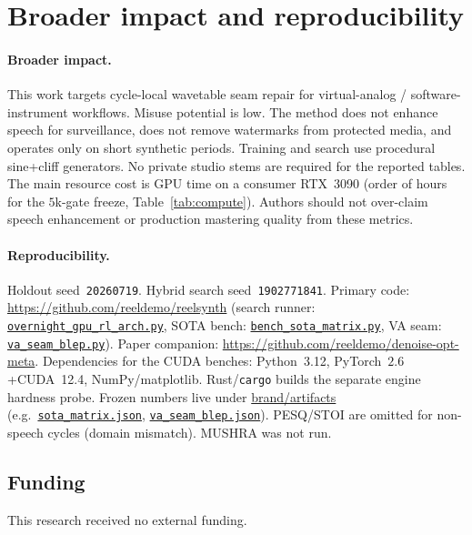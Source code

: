 \section{Broader impact and reproducibility}
\label{sec:ethics}

\paragraph{Broader impact.}
This work targets cycle-local wavetable seam repair for virtual-analog / software-instrument workflows.
Misuse potential is low.
The method does not enhance speech for surveillance, does not remove watermarks from protected media, and operates only on short synthetic periods.
Training and search use procedural sine{+}cliff generators. No private studio stems are required for the reported tables.
The main resource cost is GPU time on a consumer RTX~3090 (order of hours for the $5$k-gate freeze, Table~\ref{tab:compute}).
Authors should not over-claim speech enhancement or production mastering quality from these metrics.

\paragraph{Reproducibility.}
Holdout seed~\texttt{20260719}. Hybrid search seed~\texttt{1902771841}.
Primary code: \url{https://github.com/reeldemo/reelsynth}
(search runner:
\href{https://github.com/reeldemo/reelsynth/blob/main/scripts/overnight_gpu_rl_arch.py}{\texttt{overnight\_gpu\_rl\_arch.py}},
SOTA bench:
\href{https://github.com/reeldemo/reelsynth/blob/main/scripts/bench_sota_matrix.py}{\texttt{bench\_sota\_matrix.py}},
VA seam:
\href{https://github.com/reeldemo/reelsynth/blob/main/scripts/baselines/va_seam_blep.py}{\texttt{va\_seam\_blep.py}}).
Paper companion: \url{https://github.com/reeldemo/denoise-opt-meta}.
Dependencies for the CUDA benches: Python~3.12, PyTorch~$2.6$+CUDA~12.4, NumPy/matplotlib. Rust/\texttt{cargo} builds the separate engine hardness probe.
Frozen numbers live under
\href{https://github.com/reeldemo/reelsynth/tree/main/brand/artifacts}{brand/artifacts}
(e.g.\
\href{https://github.com/reeldemo/reelsynth/blob/main/brand/artifacts/sota_matrix.json}{\texttt{sota\_matrix.json}},
\href{https://github.com/reeldemo/reelsynth/blob/main/brand/artifacts/va_seam_blep.json}{\texttt{va\_seam\_blep.json}}).
PESQ/STOI are omitted for non-speech cycles (domain mismatch). MUSHRA was not run.

\subsection{Funding}
\label{sec:funding}
This research received no external funding.

